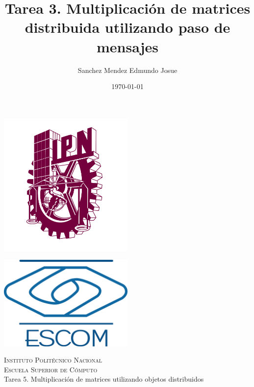 \documentclass[11pt]{article}
\date{\today}
\title{Tarea 3. Multiplicación de matrices distribuida utilizando paso de mensajes}
\author{Sanchez Mendez Edmundo Josue}
\begin{document}
		\begin{titlepage}
			\begin{center}
				
				
				\noindent
				\begin{minipage}{0.5\textwidth}
					\begin{flushleft} \large
						\includegraphics[width=0.5\textwidth]{resources/ipn.png}
					\end{flushleft}
				\end{minipage}%
				\begin{minipage}{0.55\textwidth}
					\begin{flushright} \large
						\includegraphics[width=0.5\textwidth]{resources/escom.png}
					\end{flushright}
				\end{minipage}
				
				\textsc{\LARGE Instituto Politécnico Nacional}\\[0.5cm]
				
				\textsc{\Large Escuela Superior de Cómputo}\\[1cm]
				
				
				{ \huge Tarea 5. Multiplicación de matrices utilizando objetos distribuidos \\[1cm] }
				

\end{center}
\end{titlepage}
\end{document}
